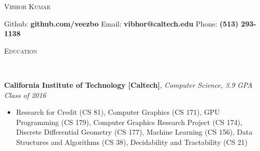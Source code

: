 \documentclass[9pt]{article}
\newenvironment{changemargin}[2]{%
  \begin{list}{}{%
    \setlength{\topsep}{0pt}%
    \setlength{\leftmargin}{#1}%
    \setlength{\rightmargin}{#2}%
    \setlength{\listparindent}{\parindent}%
    \setlength{\itemindent}{\parindent}%
    \setlength{\parsep}{\parskip}%
  }%
  \item[]}{\end{list}
}
\newcommand{\lineover}{
	\begin{changemargin}{-0.05in}{-0.05in}
		\vspace*{-8pt}
		\hrulefill \\
		\vspace*{-2pt}
	\end{changemargin}
}
\newcommand{\header}[1]{
	\begin{changemargin}{-0.5in}{-0.5in}
		\scshape{#1}\\
  	\lineover
	\end{changemargin}
}
\newenvironment{body} {
	\vspace*{-16pt}
	\begin{changemargin}{-0.25in}{-0.5in}
  }	
	{\end{changemargin}
}
\begin{document}
\begin{center} 
	{\Large \scshape Vibhor Kumar} 
\end{center}
Github: \textbf{github.com/veezbo} \hspace{5mm} Email: \textbf{vibhor@caltech.edu} \hfill Phone: \textbf{(513) 293-1138}\\
\vspace{3pt}
\smallskip
\header{Education}
\smallskip
\begin{body}
	\vspace{14pt}
	\textbf{California Institute of Technology [Caltech]}{}, \emph{Computer Science, 3.9 GPA} \hfill \emph{Class of 2016}{} \\
	\begin{itemize} \itemsep -0pt
	\item Research for Credit (CS 81), Computer Graphics (CS 171), GPU Programming (CS 179),  Computer Graphics Research Project (CS 174), Discrete Differential Geometry (CS 177), Machine Learning (CS 156), Data Structures and Algorithms (CS 38), Decidability and Tractability (CS 21)
	\end{itemize}
\end{body}

\smallskip
\end{document}

